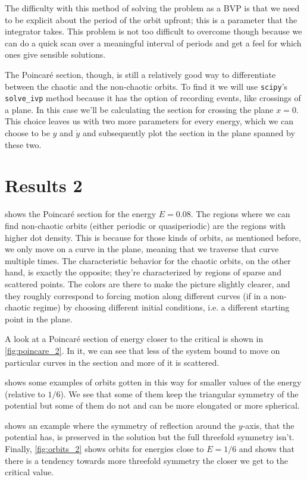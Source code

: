 \documentclass[10pt,a4paper,twocolumn]{article}
\begin{document}
The difficulty with this method of solving the problem as a BVP is that we need to be explicit about the period of the orbit upfront; this is a parameter that the integrator takes. This problem is not too difficult to overcome though because we can do a quick scan over a meaningful interval of periods and get a feel for which ones give sensible solutions.

The Poincar\'e section, though, is still a relatively good way to differentiate between the chaotic and the non-chaotic orbits. To find it we will use \texttt{scipy}'s \texttt{solve\_ivp} method \cite{ivp} because it has the option of recording events, like crossings of a plane. In this case we'll be calculating the section for crossing the plane $x=0$. This choice leaves us with two more parameters for every energy, which we can choose to be $y$ and $\dot{y}$ and subsequently plot the section in the plane spanned by these two.


\section{Results 2}

 shows the Poincar\'e section for the energy $E=0.08$. The regions where we can find non-chaotic orbits (either periodic or quasiperiodic) are the regions with higher dot density. This is because for those kinds of orbits, as mentioned before, we only move on a curve in the plane, meaning that we traverse that curve multiple times. The characteristic behavior for the chaotic orbits, on the other hand, is exactly the opposite; they're characterized by regions of sparse and scattered points. The colors are there to make the picture slightly clearer, and they roughly correspond to forcing motion along different curves (if in a non-chaotic regime) by choosing different initial conditions, i.e. a different starting point in the plane.

A look at a Poincar\'e section of energy closer to the critical is shown in \cref{fig:poincare_2}. In it, we can see that less of the system bound to move on particular curves in the section and more of it is scattered.

 shows some examples of orbits gotten in this way for smaller values of the energy (relative to $1/6$). We see that some of them keep the triangular symmetry of the potential but some of them do not and can be more elongated or more spherical.

 shows an example where the symmetry of reflection around the $y$-axis, that the potential has, is preserved in the solution but the full threefold symmetry isn't. Finally, \cref{fig:orbits_2} shows orbits for energies close to $E = 1/6$ and shows that there is a tendency towards more threefold symmetry the closer we get to the critical value.

\printbibliography
\end{document}

